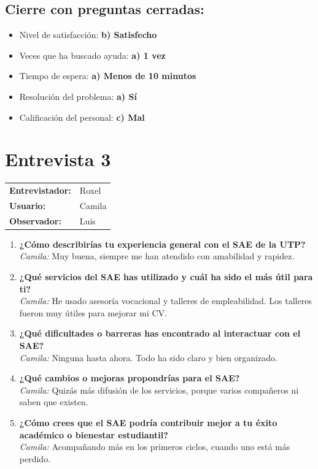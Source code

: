 \documentclass{article}
\begin{document}
\subsection*{Cierre con preguntas cerradas:}
\begin{itemize}
    \item Nivel de satisfacción: \textbf{b) Satisfecho}
    \item Veces que ha buscado ayuda: \textbf{a) 1 vez}
    \item Tiempo de espera: \textbf{a) Menos de 10 minutos}
    \item Resolución del problema: \textbf{a) Sí}
    \item Calificación del personal: \textbf{c) Mal}
\end{itemize}

\section*{Entrevista 3}
\begin{tabular}{ll}
\textbf{Entrevistador:} & Roxel \\
\textbf{Usuario:} & Camila \\
\textbf{Observador:} & Luis \\
\end{tabular}
\vspace{-0.5cm}
\begin{enumerate}[leftmargin=*, label=\textbf{\arabic*.}]
    \item \textbf{¿Cómo describirías tu experiencia general con el SAE de la UTP?} \\
    \textcolor{responsegray}{\textit{Camila:} Muy buena, siempre me han atendido con amabilidad y rapidez.}
    
    \item \textbf{¿Qué servicios del SAE has utilizado y cuál ha sido el más útil para ti?} \\
    \textcolor{responsegray}{\textit{Camila:} He usado asesoría vocacional y talleres de empleabilidad. Los talleres fueron muy útiles para mejorar mi CV.}
    
    \item \textbf{¿Qué dificultades o barreras has encontrado al interactuar con el SAE?} \\
    \textcolor{responsegray}{\textit{Camila:} Ninguna hasta ahora. Todo ha sido claro y bien organizado.}
    
    \item \textbf{¿Qué cambios o mejoras propondrías para el SAE?} \\
    \textcolor{responsegray}{\textit{Camila:} Quizás más difusión de los servicios, porque varios compañeros ni saben que existen.}
    
    \item \textbf{¿Cómo crees que el SAE podría contribuir mejor a tu éxito académico o bienestar estudiantil?} \\
    \textcolor{responsegray}{\textit{Camila:} Acompañando más en los primeros ciclos, cuando uno está más perdido.}
\end{enumerate}
\end{document}
